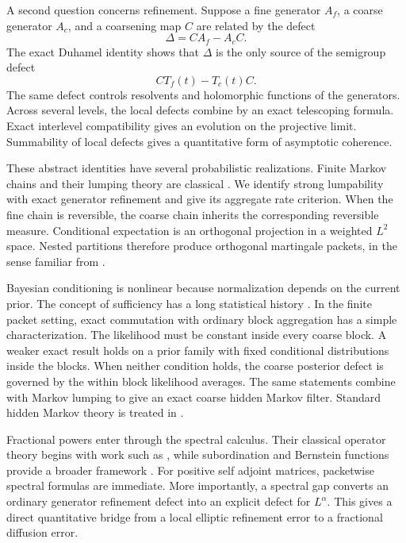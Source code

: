 \documentclass{aomart}
\theoremstyle{definition}
\theoremstyle{remark}
\begin{document}
A second question concerns refinement. Suppose a fine generator \(A_f\), a coarse generator \(A_c\), and a coarsening map \(C\) are related by the defect
\[
\Delta=CA_f-A_cC.
\]
The exact Duhamel identity shows that \(\Delta\) is the only source of the semigroup defect
\[
CT_f(t)-T_c(t)C.
\]
The same defect controls resolvents and holomorphic functions of the generators. Across several levels, the local defects combine by an exact telescoping formula. Exact interlevel compatibility gives an evolution on the projective limit. Summability of local defects gives a quantitative form of asymptotic coherence.

These abstract identities have several probabilistic realizations. Finite Markov chains and their lumping theory are classical \cite{Norris1997,RogersPitman1981}. We identify strong lumpability with exact generator refinement and give its aggregate rate criterion. When the fine chain is reversible, the coarse chain inherits the corresponding reversible measure. Conditional expectation is an orthogonal projection in a weighted \(L^2\) space. Nested partitions therefore produce orthogonal martingale packets, in the sense familiar from \cite{Williams1991,Kallenberg2021}.

Bayesian conditioning is nonlinear because normalization depends on the current prior. The concept of sufficiency has a long statistical history \cite{BlackwellGirshick1954,HalmosSavage1949}. In the finite packet setting, exact commutation with ordinary block aggregation has a simple characterization. The likelihood must be constant inside every coarse block. A weaker exact result holds on a prior family with fixed conditional distributions inside the blocks. When neither condition holds, the coarse posterior defect is governed by the within block likelihood averages. The same statements combine with Markov lumping to give an exact coarse hidden Markov filter. Standard hidden Markov theory is treated in \cite{CappeMoulinesRyden2005}.

Fractional powers enter through the spectral calculus. Their classical operator theory begins with work such as \cite{Balakrishnan1960}, while subordination and Bernstein functions provide a broader framework \cite{SchillingSongVondracek2012}. For positive self adjoint matrices, packetwise spectral formulas are immediate. More importantly, a spectral gap converts an ordinary generator refinement defect into an explicit defect for \(L^\alpha\). This gives a direct quantitative bridge from a local elliptic refinement error to a fractional diffusion error.
\end{document}
